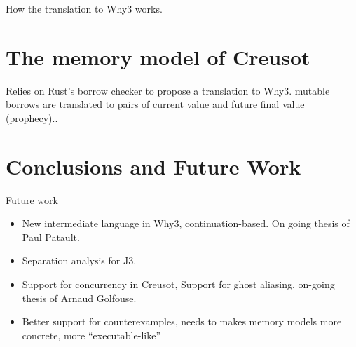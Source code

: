 \documentclass[a4paper,twoside]{article}
\begin{document}
How the translation to Why3 works.

\section{The memory model of Creusot}

Relies on Rust's borrow checker to propose a translation to Why3. mutable
borrows are translated to pairs of current value and future final value
(prophecy).\cite{denis23phd,denis22icfem,matsushita22pldi}.

\section{Conclusions and Future Work}

Future work
\begin{itemize}
\item New intermediate language in Why3, continuation-based. On going thesis of
  Paul Patault.
\item Separation analysis for J3.
\item Support for concurrency in Creusot, Support for ghost aliasing, on-going
  thesis of Arnaud Golfouse.
\item Better support for counterexamples, needs to makes memory models more
  concrete, more ``executable-like''
\end{itemize}


%


\end{document}

